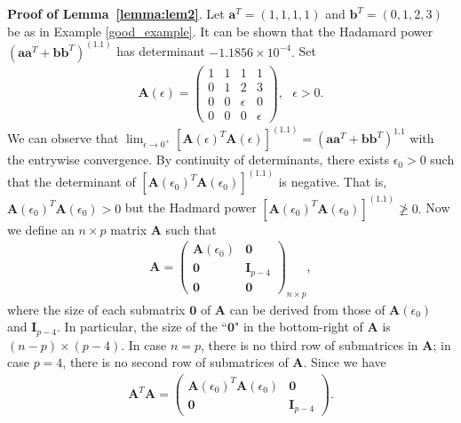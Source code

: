 \documentclass[conference,letterpaper]{IEEEtran}
\numberwithin{equation}{section}
\newcommand{\beaa}{\begin{eqnarray*}}
\newcommand{\eeaa}{\end{eqnarray*}}
\begin{document}
\noindent\textbf{Proof of Lemma~\ref{lemma:lem2}}. 
Let $\mathbf{a}^T=(1,1,1,1)$ and $\mathbf{b}^T=(0,1,2,3)$ be as in Example \ref{good_example}.
It can be shown that the Hadamard power $(\mathbf{a}\mathbf{a}^T+\mathbf{b}\mathbf{b}^T)^{(1.1)}$ has determinant $-1.1856\times 10^{-4}.$
Set
\beaa
\mathbf{A}(\epsilon)=
\begin{pmatrix}
1 & 1& 1 & 1\\
0 & 1& 2 & 3\\
0 & 0 & \epsilon & 0\\
0 & 0& 0 & \epsilon
\end{pmatrix}
,\ \ \ \epsilon>0.
\eeaa
We can observe that $\lim_{\epsilon \to 0^+}[\mathbf{A}(\epsilon)^T\mathbf{A}(\epsilon)]^{(1.1)}=(\mathbf{a}\mathbf{a}^T+\mathbf{b}\mathbf{b}^T)^{1.1}$ with the entrywise convergence. 
By continuity of determinants, there exists $\epsilon_0>0$ such that the determinant of $[\mathbf{A}(\epsilon_0)^T\mathbf{A}(\epsilon_0)]^{(1.1)}$ is negative. That is,  $\mathbf{A}(\epsilon_0)^T\mathbf{A}(\epsilon_0)>0$ but the Hadmard power $[\mathbf{A}(\epsilon_0)^T\mathbf{A}(\epsilon_0)]^{(1.1)} \ngeqslant 0.$ Now we define an $n\times p$ matrix $\mathbf{A}$ such that
\beaa
\mathbf{A}=
\begin{pmatrix}
  \mathbf{A}(\epsilon_0) & \mathbf{0}\\
\mathbf{0} & \mathbf{I}_{p-4}\\
\mathbf{0} & \mathbf{0}
\end{pmatrix}
_{n\times p},
\eeaa
where the size of each submatrix $\mathbf{0}$ of $\mathbf{A}$ can be derived from those of $\mathbf{A}(\epsilon_0)$ and $\mathbf{I}_{p-4}.$ In particular, the size of the  ``$\mathbf{0}$" in the bottom-right of $\mathbf{A}$ is $(n-p)\times (p-4).$ In case $n=p$, there is no  third row of submatrices in $\mathbf{A}$; in case $p=4$, there is no  second row of submatrices of $\mathbf{A}$. Since we have
\beaa
\mathbf{A}^T\mathbf{A}
=
\begin{pmatrix}
\mathbf{A}(\epsilon_0)^T\mathbf{A}(\epsilon_0) & \mathbf{0}\\
\mathbf{0} & \mathbf{I}_{p-4}
\end{pmatrix}
.
\eeaa
\end{document}
